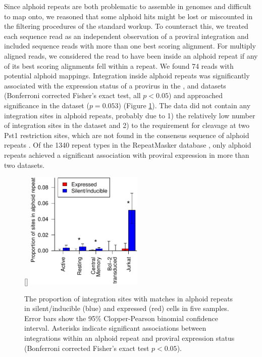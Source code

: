 \documentclass[../sherrill-Mix_thesis.tex]{subfiles}
\begin{document}
		Since alphoid repeats are both problematic to assemble in genomes and difficult to map onto, we reasoned that some alphoid hits might be lost or miscounted in the filtering procedures of the standard workup. To counteract this, we treated each sequence read as an independent observation of a proviral integration and included sequence reads with more than one best scoring alignment. For multiply aligned reads, we considered the read to have been inside an alphoid repeat if any of its best scoring alignments fell within a repeat.  We found 74 reads with potential alphoid mappings.  Integration inside alphoid repeats was significantly associated with the expression status of a provirus in the \Resting{}, \Jurkat{} and \Memory{} datasets (Bonferroni corrected Fisher's exact test, all $p < 0.05$) and approached significance in the \Active{} dataset ($p=0.053$) (Figure \ref{alphoid}). The \Bcl{} data did not contain any integration sites in alphoid repeats, probably due to 1) the relatively low number of integration sites in the dataset and 2) to the requirement for cleavage at two Pst1 restriction sites, which are not found in the consensus sequence of alphoid repeats \citep{Jurka2005}. Of the 1340 repeat types in the RepeatMasker database \citep{Jurka2005}, only alphoid repeats achieved a significant association with proviral expression in more than two datasets.

	\begin{figure}
		\centering
			[\FBwidth]{
				\includegraphics[width=0.5\textwidth]{alphoidBar.pdf} %
			}{
				\caption[Alphoid repeats and latency]{The proportion of integration sites with matches in alphoid repeats in silent/inducible (blue) and expressed (red) cells in five samples. Error bars show the 95\% Clopper-Pearson binomial confidence interval. Asterisks indicate significant associations between integrations within an alphoid repeat and proviral expression status (Bonferroni corrected Fisher's exact test $p<0.05$).}
				\label{alphoid}
			}
	\end{figure}
\end{document}
